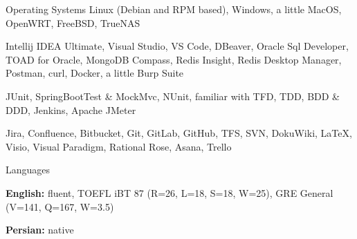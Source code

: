 \begin{cvskills}
\cvskill
  {Operating Systems} %
  {Linux (Debian and RPM based), Windows, a little MacOS, OpenWRT, FreeBSD, TrueNAS} %
  
\cvskill
  {} %
  {Intellij IDEA Ultimate, Visual Studio, VS Code, DBeaver, Oracle Sql Developer, TOAD for Oracle, MongoDB Compass, Redis Insight, Redis Desktop Manager, Postman, curl, Docker, a little Burp Suite} %
  
\cvskill
  {} %
  {JUnit, SpringBootTest \& MockMvc, NUnit, familiar with TFD, TDD, BDD \& DDD, Jenkins, Apache JMeter} %
  
\cvskill
  {} %
  {Jira, Confluence, Bitbucket, Git, GitLab, GitHub, TFS, SVN, DokuWiki, LaTeX, Visio, Visual Paradigm, Rational Rose, Asana, Trello} %

\cvskill
  {Languages} %
  { %
    \begin{cvitems} %
      \item {\textbf{English:} fluent, TOEFL iBT 87 (R=26, L=18, S=18, W=25), GRE General (V=141, Q=167, W=3.5)}
      \item {\textbf{Persian:} native}
    \end{cvitems}
  }
  
\end{cvskills}
